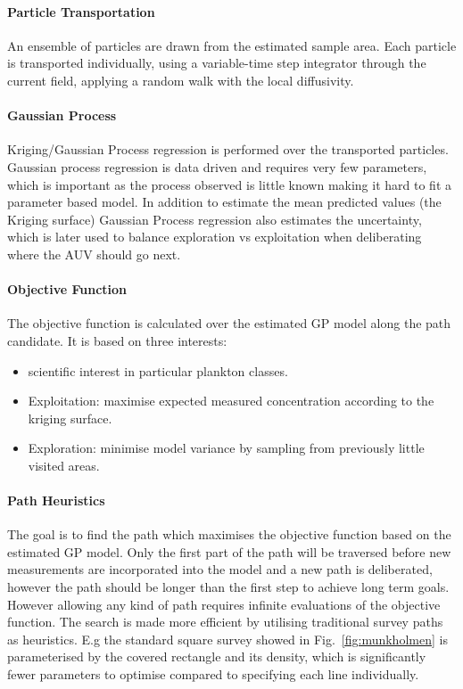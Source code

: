 \documentclass[conference]{IEEEtran}
\begin{document}
\paragraph{Particle Transportation}
An ensemble of particles are drawn from the estimated sample area. 
Each particle is transported individually, using a variable-time step integrator through the current field, applying a random walk with the local diffusivity.

\paragraph{Gaussian Process}
Kriging/Gaussian Process regression is performed over the transported particles.
Gaussian process regression is data driven and requires very few parameters, which is important as the process observed is little known making it hard to fit a parameter based model.
In addition to estimate the mean predicted values (the Kriging surface) Gaussian Process regression also estimates the uncertainty, which is later used to balance exploration vs exploitation when deliberating where the AUV should go next.

\paragraph{Objective Function}
The objective function is calculated over the estimated GP model along the path candidate.
It is based on three interests:
\begin{itemize}
    \item scientific interest in particular plankton classes.
    \item Exploitation: maximise expected measured concentration according to the kriging surface.
    \item Exploration: minimise model variance by sampling from previously little visited areas.
\end{itemize}

\paragraph{Path Heuristics}
The goal is to find the path which maximises the objective function based on the estimated GP model.
Only the first part of the path will be traversed before new measurements are incorporated into the model and a new path is deliberated, however the path should be longer than the first step to achieve long term goals.
However allowing any kind of path requires infinite evaluations of the objective function.
The search is made more efficient by utilising traditional survey paths as heuristics. E.g the standard square survey showed in Fig.~\ref{fig:munkholmen} is parameterised by the covered rectangle and its density, which is significantly fewer parameters to optimise compared to specifying each line individually. 
\end{document}
